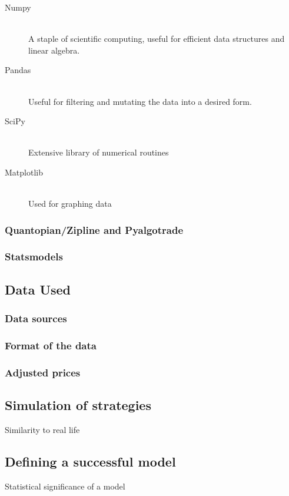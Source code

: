 \documentclass{report}
\begin{document}
\begin{description}

  \item[Numpy] \hfill \\ A staple of scientific computing, useful for efficient data structures and linear algebra.
   
  \item[Pandas] \hfill \\ Useful for filtering and mutating the data into a desired form.  
  
  \item[SciPy] \hfill \\ Extensive library of numerical routines
  
  \item[Matplotlib] \hfill \\ Used for graphing data

\end{description}  
 
  
\subsubsection{Quantopian/Zipline and Pyalgotrade}
\subsubsection{Statsmodels}

\subsection{Data Used}
\subsubsection{Data sources}
\subsubsection{Format of the data}
\subsubsection{Adjusted prices}

\subsection{Simulation of strategies}
Similarity to real life

\subsection{Defining a successful model}
Statistical significance of a model
\end{document}
